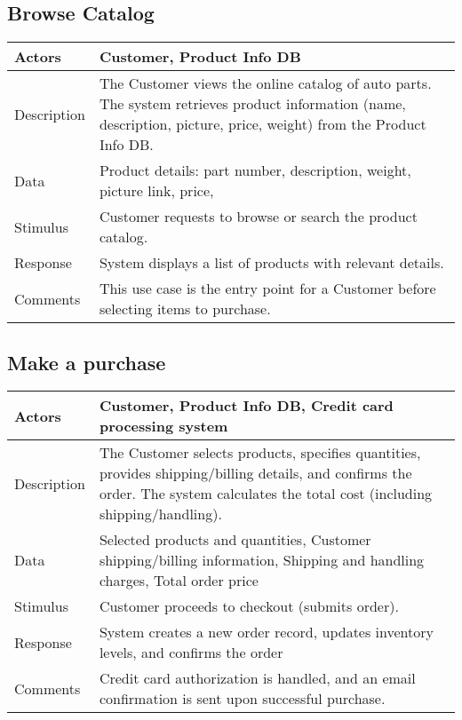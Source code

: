 \documentclass{report}
\begin{document}
    \subsection{Browse Catalog}
    \bigbreak \noindent 
    \begin{center}
        \begin{tabular}{|p{5cm}|p{8cm}|}
            \hline
            Actors & 
            Customer, Product Info DB  \\
            \hline
            Description & 
            The Customer views the online catalog of auto parts. 
            The system retrieves product information (name, description, 
            picture, price, weight) from the Product Info DB. 
             \\
            \hline
            Data & 
            Product details: part number, description, weight, picture link, 
            price, \\
            \hline
            Stimulus & 
            Customer requests to browse or search the product catalog. \\
            \hline
            Response & 
            System displays a list of products with relevant details. \\
            \hline
            Comments & 
            This use case is the entry point for a Customer 
            before selecting items to purchase. \\
            \hline
        \end{tabular}
    \end{center}

    \pagebreak 
    \subsection{Make a purchase}
    \begin{center}
        \begin{tabular}{|p{5cm}|p{8cm}|}
            \hline
            Actors & 
            Customer, Product Info DB, Credit card processing system \\
            \hline
            Description & 
            The Customer selects products, specifies quantities, provides 
            shipping/billing details, and confirms the order. The system 
            calculates the total cost (including shipping/handling). \\
            \hline
            Data & 
            Selected products and quantities, Customer shipping/billing information, Shipping and handling charges, Total order price \\
            \hline
            Stimulus & 
            Customer proceeds to checkout (submits order). \\
            \hline
            Response & 
            System creates a new order record, updates inventory levels, 
            and confirms the order \\
            \hline
            Comments & 
            Credit card authorization is handled, and an email confirmation is sent upon successful purchase. \\
            \hline
        \end{tabular}
    \end{center}
    
\end{document}

